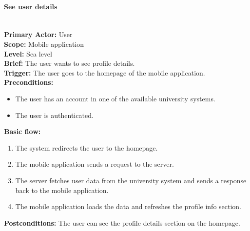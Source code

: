\paragraph{\large{See user details}}\mbox{}\\[2pt]
\textbf{Primary Actor:} User\\
\textbf{Scope:} Mobile application\\
\textbf{Level:} Sea level\\
\textbf{Brief:} The user wants to see profile details.\\
\textbf{Trigger:} The user goes to the homepage of the mobile application.\\
\textbf{Preconditions:}
\begin{itemize}
    \item The user has an account in one of the available university systems.
    \item The user is authenticated.
\end{itemize}
\textbf{Basic flow:}
\begin{enumerate}
    \item The system redirects the user to the homepage.
    \item The mobile application sends a request to the server.
    \item The server fetches user data from the university system and sends a response back to the mobile application.
    \item The mobile application loads the data and refreshes the profile info section.
\end{enumerate}
\textbf{Postconditions:}
The user can see the profile details section on the homepage.
